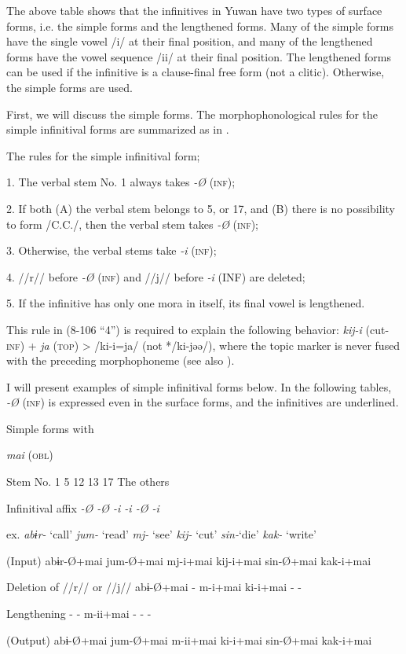 The above table shows that the infinitives in Yuwan have two types of surface forms, i.e. the simple forms and the lengthened forms. Many of the simple forms have the single vowel /i/ at their final position, and many of the lengthened forms have the vowel sequence /ii/ at their final position. The lengthened forms can be used if the infinitive is a clause-final free form (not a clitic). Otherwise, the simple forms are used.

  First, we will discuss the simple forms. The morphophonological rules for the simple infinitival forms are summarized as in .

\ea\label{ex:8-106}
  The rules for the simple infinitival form;

  1.  The verbal stem No. 1 always takes \textit{{}-Ø} (\textsc{inf});

  2.  If both (A) the verbal stem belongs to 5, or 17, and (B) there is no possibility to form /C.C./, then the verbal stem takes \textit{{}-Ø} (\textsc{inf});

  3.  Otherwise, the verbal stems take \textit{-i} (\textsc{inf});

  4.  //r// before \textit{{}-Ø} (\textsc{inf}) and //j// before \textit{{}-i} (INF) are deleted;

  5.  If the infinitive has only one mora in itself, its final vowel is lengthened.

This rule in (8-106 “4”) is required to explain the following behavior: \textit{kij-i} (cut-\textsc{inf}) + \textit{ja} (\textsc{top}) > /ki-i=ja/ (not */ki-jəə/), where the topic marker is never fused with the preceding morphophoneme (see also ).

I will present examples of simple infinitival forms below. In the following tables, \textit{{}-Ø} (\textsc{inf}) is expressed even in the surface forms, and the infinitives are underlined.

\begin{table}
\caption{\label{tab:key:81}Simple forms with}\textmd{ \textit{mai}}\textmd{ (\textsc{obl})}

Stem No.  1  5  12  13  17  The others

Infinitival affix  \textit{{}-Ø  {}-Ø  {}-i  {}-i  {}-Ø  {}-i}

ex.  \textit{abɨr-} ‘call’  \textit{jum-} ‘read’  \textit{mj-} ‘see’  \textit{kij-} ‘cut’  \textit{sin-}‘die’  \textit{kak-} ‘write’

(Input)  abɨr-Ø+mai  jum-Ø+mai  mj-i+mai  kij-i+mai  sin-Ø+mai  kak-i+mai

Deletion of //r// or //j//  abɨ-Ø+mai  {}-  m-i+mai  ki-i+mai  {}-  {}-

Lengthening  {}-  {}-  m-ii+mai  {}-  {}-  {}-

(Output)  abɨ-Ø+mai  jum-Ø+mai  m-ii+mai  ki-i+mai  sin-Ø+mai  kak-i+mai
\end{table}

